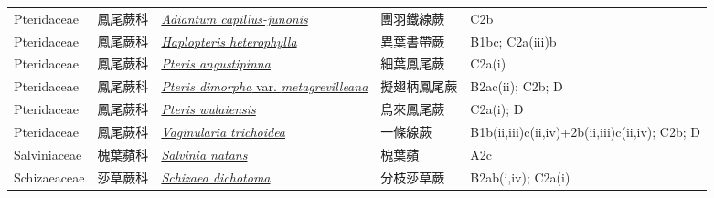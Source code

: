 {\begin{longtable}{L{2.5cm}L{2cm}L{5cm}L{2.5cm}L{3cm}}
    Pteridaceae & 鳳尾蕨科 & \href{http://www.theplantlist.org/tpl1.1/search?q=Adiantum+capillus-junonis}{\textit{Adiantum capillus-junonis} } & 團羽鐵線蕨 & C2b    \\
    Pteridaceae & 鳳尾蕨科 & \href{http://www.theplantlist.org/tpl1.1/search?q=Haplopteris+heterophylla}{\textit{Haplopteris heterophylla} } & 異葉書帶蕨 & B1bc; C2a(iii)b    \\
    Pteridaceae & 鳳尾蕨科 & \href{http://www.theplantlist.org/tpl1.1/search?q=Pteris+angustipinna}{\textit{Pteris angustipinna} } & 細葉鳳尾蕨 & C2a(i)    \\
    Pteridaceae & 鳳尾蕨科 & \href{http://www.theplantlist.org/tpl1.1/search?q=Pteris+dimorpha+var.+metagrevilleana}{\textit{Pteris dimorpha} var. \textit{metagrevilleana} } & 擬翅柄鳳尾蕨 & B2ac(ii); C2b; D    \\
    Pteridaceae & 鳳尾蕨科 & \href{http://www.theplantlist.org/tpl1.1/search?q=Pteris+wulaiensis}{\textit{Pteris wulaiensis} } & 烏來鳳尾蕨 & C2a(i); D    \\
    Pteridaceae & 鳳尾蕨科 & \href{http://www.theplantlist.org/tpl1.1/search?q=Vaginularia+trichoidea}{\textit{Vaginularia trichoidea} } & 一條線蕨 & B1b(ii,iii)c(ii,iv)+2b(ii,iii)c(ii,iv); C2b; D    \\
    Salviniaceae & 槐葉蘋科 & \href{http://www.theplantlist.org/tpl1.1/search?q=Salvinia+natans}{\textit{Salvinia natans} } & 槐葉蘋 & A2c    \\
    Schizaeaceae & 莎草蕨科 & \href{http://www.theplantlist.org/tpl1.1/search?q=Schizaea+dichotoma}{\textit{Schizaea dichotoma} } & 分枝莎草蕨 & B2ab(i,iv); C2a(i)    \\

\end{longtable}}
